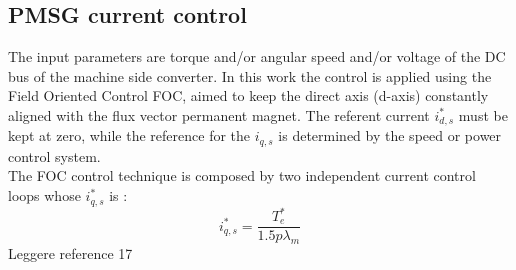 \documentclass[]{article}
\begin{document}
\subsection{PMSG current control}
The input parameters are torque and/or angular speed and/or voltage of the DC bus of the machine side converter. In this work the control is applied using the Field Oriented Control FOC, aimed to keep the direct axis (d-axis) constantly aligned with the flux vector permanent magnet. The referent current $i_{d,s}^*$ must be kept at zero, while the reference for the $i_{q,s}$ is determined by the speed or power control system.\\
The FOC control technique is composed by two independent current control loops whose $i_{q,s}^*$ is :
\begin{equation}
	i_{q,s}^* = \frac{T_e^*}{1.5p \lambda_m}
\end{equation}
Leggere reference 17


\newpage
{\footnotesize
}
\end{document}
